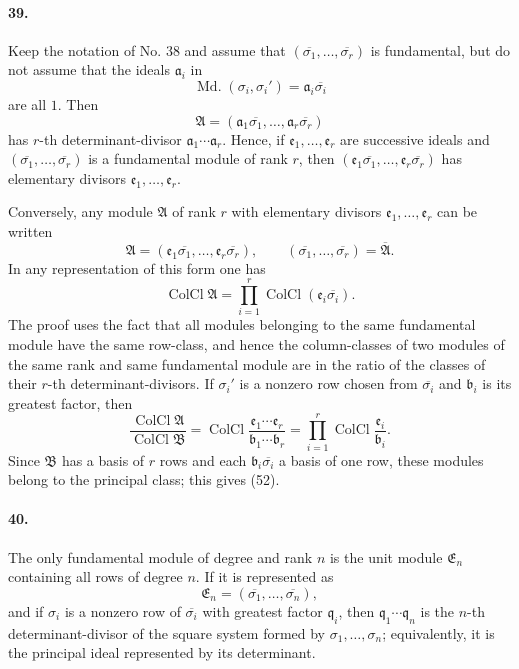 \documentclass[11pt]{article}
\newcommand{\Md}{\operatorname{Md.}}
\newcommand{\Kkl}{\operatorname{ColCl}}
\begin{document}
\paragraph{39.}
Keep the notation of No. 38 and assume that $(\overline{\sigma_1},
\ldots,
\overline{\sigma_r})$ is fundamental, but do not assume that the ideals $\mathfrak a_i$ in
\[
\Md(\sigma_i,
\sigma_i')=\mathfrak a_i\overline{\sigma_i}
\]
are all $1$. Then
\[
\mathfrak A=(\mathfrak a_1\overline{\sigma_1},
\ldots,
\mathfrak a_r\overline{\sigma_r})
\]
has $r$-th determinant-divisor $\mathfrak a_1\cdots\mathfrak a_r$. Hence, if $\mathfrak e_1,
\ldots,
\mathfrak e_r$ are successive ideals and $(\overline{\sigma_1},
\ldots,
\overline{\sigma_r})$ is a fundamental module of rank $r$, then $(\mathfrak e_1\overline{\sigma_1},
\ldots,
\mathfrak e_r\overline{\sigma_r})$ has elementary divisors $\mathfrak e_1,
\ldots,
\mathfrak e_r$.

Conversely, any module $\mathfrak A$ of rank $r$ with elementary divisors $\mathfrak e_1,
\ldots,
\mathfrak e_r$ can be written
\[
\mathfrak A=(\mathfrak e_1\overline{\sigma_1},
\ldots,
\mathfrak e_r\overline{\sigma_r}),
\qquad
(\overline{\sigma_1},
\ldots,
\overline{\sigma_r})=\overline{\mathfrak A}.
\]
In any representation of this form one has
\begin{equation}
\Kkl\mathfrak A=\prod_{i=1}^{r}\Kkl(\mathfrak e_i\overline{\sigma_i}).
\tag{52}
\end{equation}
The proof uses the fact that all modules belonging to the same fundamental module have the same row-class, and hence the column-classes of two modules of the same rank and same fundamental module are in the ratio of the classes of their $r$-th determinant-divisors. If $\sigma_i'$ is a nonzero row chosen from $\overline{\sigma_i}$ and $\mathfrak b_i$ is its greatest factor, then
\begin{equation}
\frac{\Kkl\mathfrak A}{\Kkl\mathfrak B}
=\Kkl\frac{\mathfrak e_1\cdots\mathfrak e_r}{\mathfrak b_1\cdots\mathfrak b_r}
=\prod_{i=1}^{r}\Kkl\frac{\mathfrak e_i}{\mathfrak b_i}.
\tag{51}
\end{equation}
Since $\mathfrak B$ has a basis of $r$ rows and each $\mathfrak b_i\overline{\sigma_i}$ a basis of one row, these modules belong to the principal class; this gives (52).

\paragraph{40.}
The only fundamental module of degree and rank $n$ is the unit module $\mathfrak E_n$ containing all rows of degree $n$. If it is represented as
\[
\mathfrak E_n=(\overline{\sigma_1},
\ldots,
\overline{\sigma_n}),
\]
and if $\sigma_i$ is a nonzero row of $\overline{\sigma_i}$ with greatest factor $\mathfrak q_i$, then $\mathfrak q_1\cdots\mathfrak q_n$ is the $n$-th determinant-divisor of the square system formed by $\sigma_1,
\ldots,
\sigma_n$; equivalently, it is the principal ideal represented by its determinant.
\end{document}
